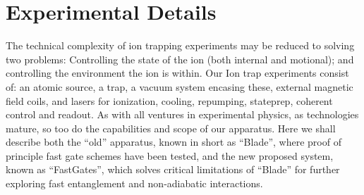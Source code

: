 \documentclass[12pt]{iopart}
\begin{document}


\section{Experimental Details}

The technical complexity of ion trapping experiments may be reduced to
solving two problems: Controlling the state of the ion (both internal
and motional); and controlling the environment the ion is within.
Our Ion trap experiments consist of: an atomic source, a trap, a
vacuum system encasing these, external magnetic field coils, and
lasers for ionization, cooling, repumping, stateprep, coherent
control and readout.
As with all ventures in experimental physics, as technologies mature, so
too do the capabilities and scope of our apparatus.  Here we shall
describe both the ``old'' apparatus, known in short as ``Blade'', where
proof of principle fast gate schemes have been tested, and the new
proposed system, known as ``FastGates'', which solves critical
limitations of ``Blade'' for further exploring fast entanglement and
non-adiabatic interactions.
\end{document}
